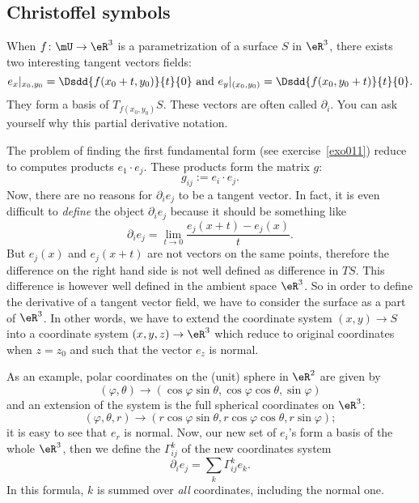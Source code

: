 	\subsection{Christoffel symbols}

	When $f\colon \mU\to \eR^3$ is a parametrization of a surface $S$ in $\eR^3$, there exists two interesting tangent vectors fields:
	\begin{equation} \label{eq_basvecto}
		e_x|_{x_0,y_0}= \Dsdd{ f(x_0+t,y_0) }{t}{0}\text{ and } e_y|_{(x_0,y_0)}=\Dsdd{ f(x_0,y_0+t) }{t}{0}.
	\end{equation}
	They form a basis of $T_{f(x_0,y_0)}S$. These vectors are often called $\partial_i$. You can ask yourself why this partial derivative notation.

	The problem of finding the first fundamental  form (see exercise~\ref{exo011}) reduce to computes products $e_1\cdot e_j$. These products form the matrix $g$:
	\[
		g_{ij}:=e_i\cdot e_j.
	\]
	Now, there are no reasons for $\partial_i e_j$ to be a tangent vector. In fact, it is even difficult to \emph{define} the object $\partial_i e_j$ because it should be something like
	\[
		\partial_i e_j=\lim_{t\to 0}\frac{ e_j(x+t)-e_j(x) }{ t }.
	\]
	But $e_j(x)$ and $e_j(x+t)$ are not vectors on the same points, therefore the difference on the right hand side is not well defined as difference in $TS$. This difference is however well defined in the ambient space $\eR^3$. So in order to define the derivative of a tangent vector field, we have to consider the surface as a part of $\eR^3$. In other words, we have to extend the coordinate system $(x,y)\to S$ into a coordinate system $(x,y,z)\to\eR^3$ which reduce to original coordinates when $z=z_0$ and such that the vector $e_z$ is normal.

	As an example, polar coordinates on the (unit) sphere in $\eR^2$ are given by
	\[
		(\varphi,\theta)\to (\cos\varphi\sin\theta,\cos\varphi\cos\theta,\sin\varphi)
	\]
	and an extension of the system is the full spherical coordinates on $\eR^3$:
	\[
		(\varphi,\theta,r)\to (r\cos\varphi\sin\theta,r\cos\varphi\cos\theta,r\sin\varphi);
	\]
	it is easy to see that $e_r$ is normal. Now, our new set of $e_i$'s form a basis of the whole $\eR^3$, then we define the  $\Gamma_{ij}^{k}$ of the new coordinates system
	\begin{equation} \label{eq_def_sch}
		\partial_ie_j=\sum_k\Gamma_{ij}^{k}e_k.
	\end{equation}
	In this formula, $k$ is summed over \emph{all} coordinates, including the normal one.

